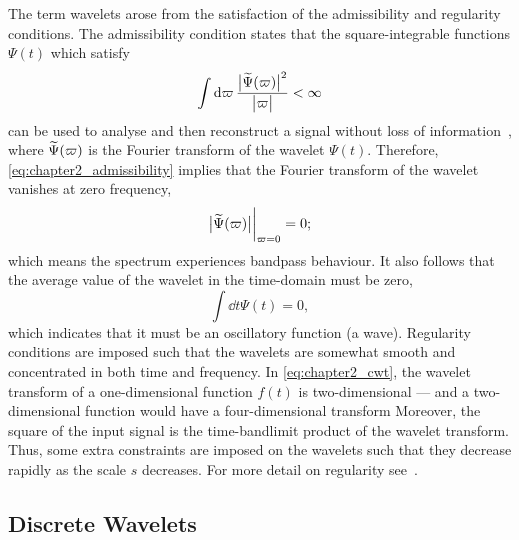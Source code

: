 The term wavelets arose from the satisfaction of the admissibility and regularity conditions.
The admissibility condition states that the square-integrable functions \(\Psi(t)\) which satisfy
%
\begin{equation}\label{eq:chapter2_admissibility}
	\int\dd{\varpi} \frac{\big\lvert\widetilde{\Psi}(\varpi)\big\rvert^{2}}{\big\lvert\varpi\big\rvert}
	< \infty
\end{equation}
%
can be used to analyse and then reconstruct a signal without loss of information~\cite{Sheng2010}, where \(\widetilde{\Psi}(\varpi)\) is the Fourier transform of the wavelet \(\Psi(t)\).
Therefore, \cref{eq:chapter2_admissibility} implies that the Fourier transform of the wavelet vanishes at zero frequency, \ie{}
%
\begin{equation}
	\big\lvert\widetilde{\Psi}(\varpi)\big\rvert \bigg\rvert_{\varpi=0}
	= 0;
\end{equation}
%
which means the spectrum experiences bandpass behaviour.
It also follows that the average value of the wavelet in the time-domain must be zero, \ie{}
%
\begin{equation}
	\int\dd{t} \Psi(t)
	= 0,
\end{equation}
%
which indicates that it must be an oscillatory function (a wave).
Regularity conditions are imposed such that the wavelets are somewhat smooth and concentrated in both time and frequency.
In \cref{eq:chapter2_cwt}, the wavelet transform of a one-dimensional function \(f(t)\) is two-dimensional --- and a two-dimensional function would have a four-dimensional transform \etc{}
Moreover, the square of the input signal is the time-bandlimit product of the wavelet transform.
Thus, some extra constraints are imposed on the wavelets such that they decrease rapidly as the scale \(s\) decreases.
For more detail on regularity see~\cite{Burrus1997,Daubechies1992}.

\subsection{Discrete Wavelets}\label{sec:chapter2_discrete_wavelets}

